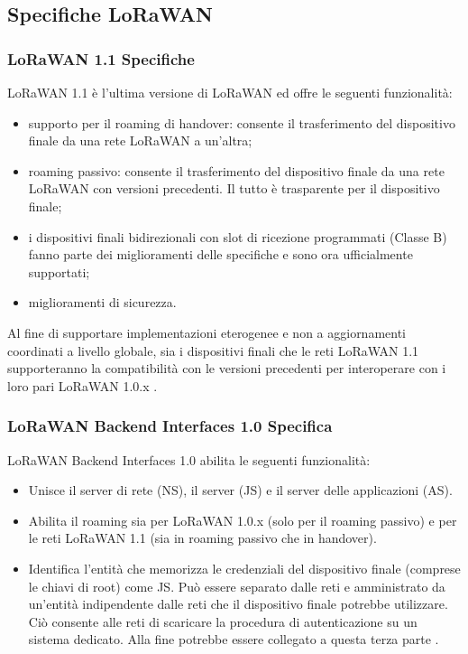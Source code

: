 \documentclass[a4paper]{report} %
\begin{document}
\subsection{Specifiche LoRaWAN}
\subsubsection{LoRaWAN 1.1 Specifiche}
LoRaWAN 1.1 è l'ultima versione di LoRaWAN ed offre le seguenti funzionalità:
\begin{itemize}
\item supporto per il roaming di handover: consente il trasferimento del dispositivo finale da una rete LoRaWAN a un'altra; 
\item roaming passivo: consente il trasferimento del dispositivo finale da una rete LoRaWAN con versioni precedenti. Il tutto è trasparente per il dispositivo finale;
\item i dispositivi finali bidirezionali con slot di ricezione programmati (Classe B) fanno parte dei miglioramenti delle specifiche e sono ora ufficialmente supportati;
\item miglioramenti di sicurezza.
\end{itemize}
Al fine di supportare implementazioni eterogenee e non a aggiornamenti coordinati a livello globale, sia i dispositivi finali che le reti LoRaWAN 1.1 supporteranno la compatibilità con le versioni precedenti per interoperare con i loro pari LoRaWAN 1.0.x \cite{art:rif.29}.

\subsubsection{LoRaWAN Backend Interfaces 1.0 Specifica}
LoRaWAN Backend Interfaces 1.0 abilita le seguenti funzionalità:
\begin{itemize}
\item Unisce il server di rete (NS), il server (JS) e il server delle applicazioni (AS).
\item Abilita il roaming sia per LoRaWAN 1.0.x (solo per il roaming passivo) e per le reti LoRaWAN 1.1 (sia in roaming passivo che in handover).
\item Identifica l'entità che memorizza le credenziali del dispositivo finale (comprese le chiavi di root) come JS. Può essere separato dalle reti e amministrato da un'entità indipendente dalle reti che il dispositivo finale potrebbe utilizzare. Ciò consente alle reti di scaricare la procedura di autenticazione su un sistema dedicato. Alla fine potrebbe essere collegato a questa terza parte \cite{art:rif.29}.
\end{itemize}
\end{document}
